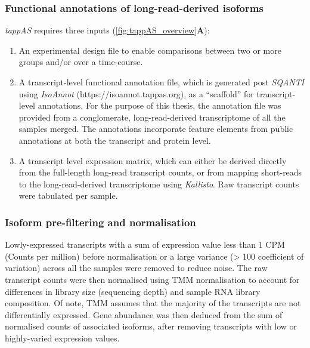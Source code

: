 \clearpage
\subsubsection{Functional annotations of long-read-derived isoforms}
\textit{tappAS} requires three inputs (\cref{fig:tappAS_overview}\textbf{A}):
\begin{enumerate}
	\item An experimental design file to enable comparisons between two or more groups and/or over a time-course. 
	\item A transcript-level functional annotation file, which is generated post \textit{SQANTI} using \textit{IsoAnnot} (https://isoannot.tappas.org), as a “scaffold” for transcript-level annotations. For the purpose of this thesis, the annotation file was provided from a conglomerate, long-read-derived transcriptome of all the samples merged. The annotations incorporate feature elements from public annotations at both the transcript and protein level. 
	\item A transcript level expression matrix, which can either be derived directly from the full-length long-read transcript counts, or from mapping short-reads to the long-read-derived transcriptome using \textit{Kallisto}\cite{Bray2016}. Raw transcript counts were tabulated per sample.  	 
\end{enumerate}


\subsubsection{Isoform pre-filtering and normalisation}
Lowly-expressed transcripts with a sum of expression value less than 1 CPM (Counts per million) before normalisation or a large variance (> 100 coefficient of variation) across all the samples were removed to reduce noise. The raw transcript counts were then normalised using TMM normalisation \cite{Robinson2010} to account for differences in library size (sequencing depth) and sample RNA library composition. Of note, TMM assumes that the majority of the transcripts are not differentially expressed. Gene abundance was then deduced from the sum of normalised counts of associated isoforms, after removing transcripts with low or highly-varied expression values. 
 

